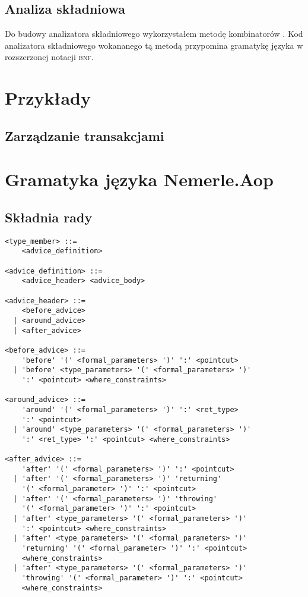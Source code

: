 \documentclass[a4paper,12pt]{mwbk}
\begin{document}
\section{Analiza składniowa}

Do budowy analizatora składniowego wykorzystałem metodę kombinatorów
\cite{FunParsers,FunParsing}.  Kod analizatora składniowego wokananego tą
metodą przypomina gramatykę języka w rozszerzonej notacji \textsc{bnf}.

\chapter{Przykłady}

\section{Zarządzanie transakcjami}




\appendix

\chapter{Gramatyka języka Nemerle.Aop}

\section{Składnia rady}

\begin{lstlisting}[style=grammar]
<type_member> ::= 
    <advice_definition>

<advice_definition> ::= 
    <advice_header> <advice_body>

<advice_header> ::=
    <before_advice> 
  | <around_advice> 
  | <after_advice>

<before_advice> ::= 
    'before' '(' <formal_parameters> ')' ':' <pointcut>
  | 'before' <type_parameters> '(' <formal_parameters> ')' 
    ':' <pointcut> <where_constraints>

<around_advice> ::=
    'around' '(' <formal_parameters> ')' ':' <ret_type> 
    ':' <pointcut>
  | 'around' <type_parameters> '(' <formal_parameters> ')' 
    ':' <ret_type> ':' <pointcut> <where_constraints>

<after_advice> ::= 
    'after' '(' <formal_parameters> ')' ':' <pointcut>
  | 'after' '(' <formal_parameters> ')' 'returning' 
    '(' <formal_parameter> ')' ':' <pointcut>
  | 'after' '(' <formal_parameters> ')' 'throwing' 
    '(' <formal_parameter> ')' ':' <pointcut>
  | 'after' <type_parameters> '(' <formal_parameters> ')' 
    ':' <pointcut> <where_constraints>
  | 'after' <type_parameters> '(' <formal_parameters> ')' 
    'returning' '(' <formal_parameter> ')' ':' <pointcut>
    <where_constraints>
  | 'after' <type_parameters> '(' <formal_parameters> ')' 
    'throwing' '(' <formal_parameter> ')' ':' <pointcut>
    <where_constraints>
\end{lstlisting}
\end{document}
